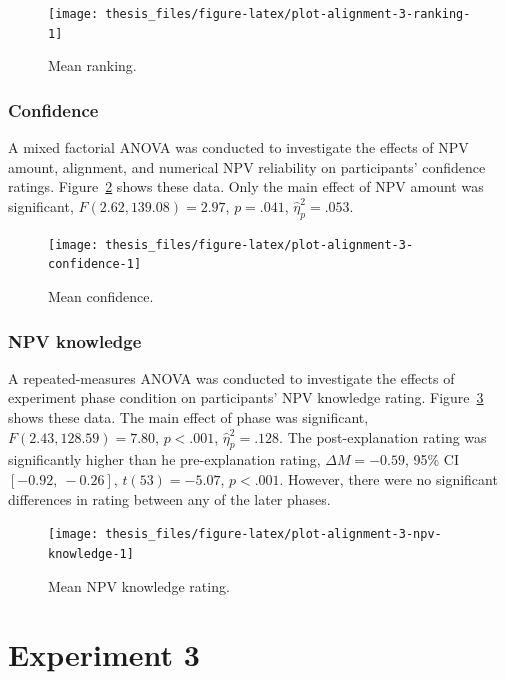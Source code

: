 \documentclass[a4paper, nobind, dvipsnames]{templates/ociamthesis}
\theoremstyle{definition}
\theoremstyle{definition}
\theoremstyle{definition}
\theoremstyle{definition}
\theoremstyle{remark}
\begin{document}
\begin{figure}
\texttt{[image: thesis\_files/figure-latex/plot-alignment-3-ranking-1]} \caption{Mean ranking.}\label{fig:plot-alignment-3-ranking}
\end{figure}

\subsubsection{Confidence}

A mixed factorial ANOVA was conducted to investigate the effects of NPV amount,
alignment, and numerical NPV reliability on participants' confidence ratings.
Figure~\ref{fig:plot-alignment-3-confidence} shows these data. Only the main
effect of NPV amount was significant,
\(F(2.62, 139.08) = 2.97\), \(p = .041\), \(\hat{\eta}^2_p = .053\).



\begin{figure}
\texttt{[image: thesis\_files/figure-latex/plot-alignment-3-confidence-1]} \caption{Mean confidence.}\label{fig:plot-alignment-3-confidence}
\end{figure}

\subsubsection{NPV knowledge}

A repeated-measures ANOVA was conducted to investigate the effects of experiment
phase condition on participants' NPV knowledge rating.
Figure~\ref{fig:plot-alignment-3-npv-knowledge} shows these data. The main
effect of phase was significant, \(F(2.43, 128.59) = 7.80\), \(p < .001\), \(\hat{\eta}^2_p = .128\).
The post-explanation rating was significantly higher than he pre-explanation
rating,
\(\Delta M = -0.59\), 95\% CI \([-0.92,~-0.26]\), \(t(53) = -5.07\), \(p < .001\). However, there were no significant
differences in rating between any of the later phases.



\begin{figure}
\texttt{[image: thesis\_files/figure-latex/plot-alignment-3-npv-knowledge-1]} \caption{Mean NPV knowledge rating.}\label{fig:plot-alignment-3-npv-knowledge}
\end{figure}

\hypertarget{alignment-8-appendix}{%
\section{Experiment 3}\label{alignment-8-appendix}}
\end{document}
